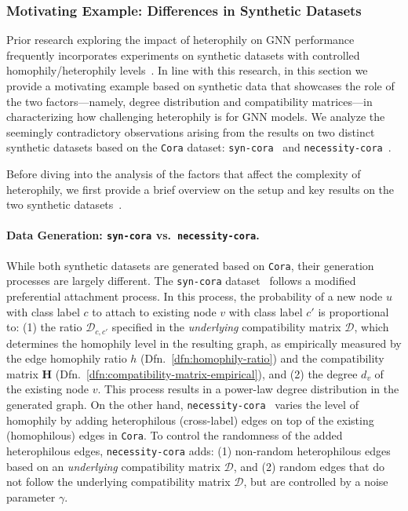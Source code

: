 \subsubsection{Motivating Example: Differences in Synthetic Datasets} 
\label{sec:complexity-motivating-example}

Prior research exploring the impact of heterophily on GNN performance frequently incorporates experiments on synthetic datasets with controlled homophily/heterophily levels~\cite{MixHop,zhu2020beyond,ma2021homophily,luan2022revisiting}. 
In line with this research, in this section we provide a motivating example based on synthetic data that showcases the role of the two factors---namely, degree distribution and compatibility matrices---in characterizing how challenging heterophily is for GNN models.
We analyze the seemingly contradictory observations arising from the results on two distinct synthetic datasets based on the \texttt{Cora} dataset: \texttt{syn-cora}~\cite{zhu2020beyond} and \texttt{necessity-cora}~\cite{ma2021homophily}.

Before diving into the analysis of the factors that affect the complexity of heterophily, we first provide a brief overview on the setup and key results on the two synthetic datasets~\cite{zhu2020beyond,ma2021homophily}.

\paragraph{Data Generation: \texttt{syn-cora} vs.~\texttt{necessity-cora}.} 
While both synthetic datasets are generated based on \texttt{Cora}, their generation processes are largely different. 
The \texttt{syn-cora} dataset~\cite{zhu2020beyond,zhu2021graph} follows a modified preferential attachment process. In this process, the probability of a new node $u$ with class label $c$ to attach to existing node $v$ with class label $c'$ is proportional to: 
(1) the ratio $\mathcal{D}_{c,c'}$ specified in the \emph{underlying} compatibility matrix $\mathcal{D}$, which determines the homophily level in the resulting graph, as empirically measured by the edge homophily ratio $h$ (Dfn.~\ref{dfn:homophily-ratio}) and the compatibility matrix $\mathbf{H}$ (Dfn.~\ref{dfn:compatibility-matrix-empirical}),
and (2) the degree $d_v$ of the existing node $v$.
This process results in a power-law degree distribution in the generated graph. 
On the other hand, \texttt{necessity-cora}~\cite{ma2021homophily} varies the level of homophily by adding heterophilous (cross-label) edges on top of the existing (homophilous) edges in \texttt{Cora}. 
To control the randomness of the added heterophilous edges, \texttt{necessity-cora} adds: 
(1) non-random heterophilous edges based on an \emph{underlying} compatibility matrix $\mathcal{D}$, and 
(2) random edges that do not follow the underlying compatibility matrix $\mathcal{D}$, but are controlled by a noise parameter $\gamma$. 

